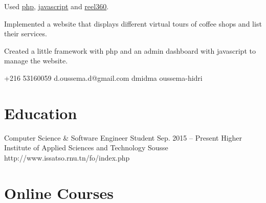 \documentclass{tccv}
\begin{document}
\begin{eventlist}
    {}
        
    \begin{cvitems}
    \item {Used \href{http://php.net}{php}, \href{https://www.javascript.com}{javascript} and \href{http://reel360.org/reel}{reel360}.}
    \item {Implemented a website that displays different virtual tours of coffee shops and list their services.}
    \item {Created a little framework with php and an admin dashboard with javascript to manage the website.}
    \end{cvitems}


\end{eventlist}

    {+216 53160059}
    {d.oussema.d@gmail.com}
    {dmidma}
    {oussema-hidri}

\section{Education}

\begin{yearlist}

\item{Computer Science \& Software Engineer Student}
     {Sep. 2015 -- Present}
     {}
     {Higher Institute of Applied Sciences and Technology Sousse}
     {http://www.issatso.rnu.tn/fo/index.php}

\end{yearlist}


\section{Online Courses}
\end{document}
